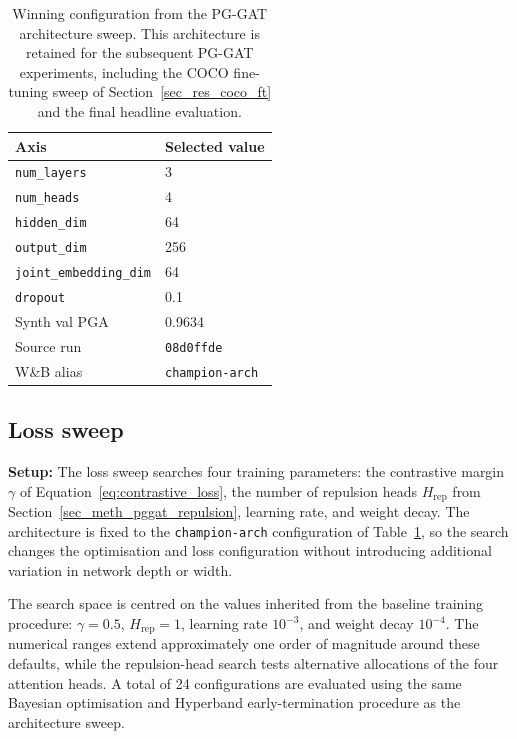 \begin{table}[H]
\centering
\caption[Winning configuration from the PG-GAT architecture sweep.]{Winning configuration from the PG-GAT architecture sweep.
This architecture is retained for the subsequent PG-GAT experiments,
including the COCO fine-tuning sweep of Section~\ref{sec_res_coco_ft}
and the final headline evaluation.}
\label{tab:arch_sweep_winner}
\tablesize
\begin{tabular}{ll}
\toprule
Axis & Selected value \\
\midrule
\texttt{num\_layers}           & 3 \\
\texttt{num\_heads}            & 4 \\
\texttt{hidden\_dim}           & 64 \\
\texttt{output\_dim}           & 256 \\
\texttt{joint\_embedding\_dim} & 64 \\
\texttt{dropout}               & 0.1 \\
\midrule
Synth val PGA                  & 0.9634 \\
Source run                     & \texttt{08d0ffde} \\
W\&B alias                     & \texttt{champion-arch} \\
\bottomrule
\end{tabular}
\end{table}

\subsection{Loss sweep}
\label{sec_res_pggat_loss_sweep}

\textbf{Setup:}
The loss sweep searches four training parameters:
the contrastive margin $\gamma$ of Equation~\eqref{eq:contrastive_loss},
the number of repulsion heads $H_{\text{rep}}$ from
Section~\ref{sec_meth_pggat_repulsion},
learning rate,
and weight decay.
The architecture is fixed to the \texttt{champion-arch} configuration
of Table~\ref{tab:arch_sweep_winner},
so the search changes the optimisation and loss configuration without
introducing additional variation in network depth or width.

The search space is centred on the values inherited from the baseline
training procedure:
$\gamma=0.5$,
$H_{\text{rep}}=1$,
learning rate $10^{-3}$,
and weight decay $10^{-4}$.
The numerical ranges extend approximately one order of magnitude
around these defaults,
while the repulsion-head search tests alternative allocations
of the four attention heads.
A total of 24 configurations are evaluated using the same Bayesian
optimisation and Hyperband early-termination procedure as the
architecture sweep.

